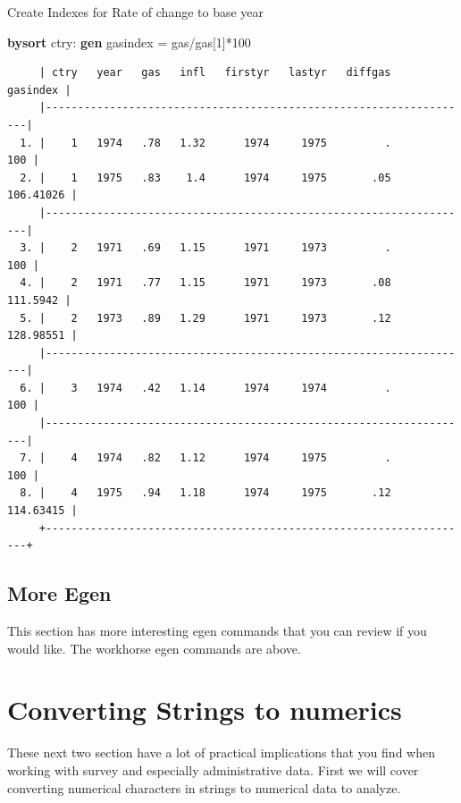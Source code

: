 \documentclass[
]{book}
\newenvironment{Shaded}{\begin{snugshade}}{\end{snugshade}}
\newcommand{\KeywordTok}[1]{\textcolor[rgb]{0.13,0.29,0.53}{\textbf{#1}}}
\newcommand{\NormalTok}[1]{#1}
\begin{document}
Create Indexes for Rate of change to base year

\begin{Shaded}
\begin{Highlighting}[]
\KeywordTok{bysort}\NormalTok{ ctry: }\KeywordTok{gen}\NormalTok{ gasindex = gas/gas[1]*100}
\end{Highlighting}
\end{Shaded}

\begin{verbatim}
     | ctry   year   gas   infl   firstyr   lastyr   diffgas    gasindex |
     |-------------------------------------------------------------------|
  1. |    1   1974   .78   1.32      1974     1975         .         100 |
  2. |    1   1975   .83    1.4      1974     1975       .05   106.41026 |
     |-------------------------------------------------------------------|
  3. |    2   1971   .69   1.15      1971     1973         .         100 |
  4. |    2   1971   .77   1.15      1971     1973       .08    111.5942 |
  5. |    2   1973   .89   1.29      1971     1973       .12   128.98551 |
     |-------------------------------------------------------------------|
  6. |    3   1974   .42   1.14      1974     1974         .         100 |
     |-------------------------------------------------------------------|
  7. |    4   1974   .82   1.12      1974     1975         .         100 |
  8. |    4   1975   .94   1.18      1974     1975       .12   114.63415 |
     +-------------------------------------------------------------------+
\end{verbatim}

\subsection{More Egen}\label{more-egen}

This section has more interesting egen commands that you can review if you would like. The workhorse egen commands are above.

\section{Converting Strings to numerics}\label{converting-strings-to-numerics}

These next two section have a lot of practical implications that you find when working with survey and especially administrative data. First we will cover converting numerical characters in strings to numerical data to analyze.
\end{document}
